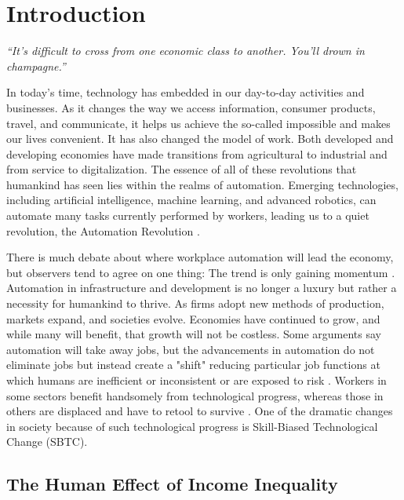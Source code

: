 \chapter{Introduction}
\label{ch:intro}

\emph{“It's difficult to cross from one economic class to another. You'll drown in champagne.”}

\hspace{20pt}In today's time, technology has embedded in our day-to-day activities and businesses. As it changes the way we access information, consumer products, travel, and communicate, it helps us achieve the so-called impossible and makes our lives convenient. It has also changed the model of work. Both developed and developing economies have made transitions from agricultural to industrial and from service to digitalization. The essence of all of these revolutions that humankind has seen lies within the realms of automation. Emerging technologies, including artificial intelligence, machine learning, and advanced robotics, can automate many tasks currently performed by workers, leading us to a quiet revolution, the Automation Revolution \cite{tobenkin_2019}.

There is much debate about where workplace automation will lead the economy, but observers tend to agree on one thing: The trend is only gaining momentum \cite{uzialko_2019}. Automation in infrastructure and development is no longer a luxury but rather a necessity for humankind to thrive. As firms adopt new methods of production, markets expand, and societies evolve. Economies have continued to grow, and while many will benefit, that growth will not be costless. Some arguments say automation will take away jobs, but the advancements in automation do not eliminate jobs but instead create a "shift" reducing particular job functions at which humans are inefficient or inconsistent or are exposed to risk \cite{tobenkin_2019}. Workers in some sectors benefit handsomely from technological progress, whereas those in others are displaced and have to retool to survive \cite{sumagaysay_2019}. One of the dramatic changes in society because of such technological progress is Skill-Biased Technological Change (SBTC).

\section{The Human Effect of Income Inequality}

